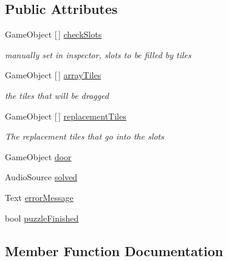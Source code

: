 \subsection*{Public Attributes}
\begin{DoxyCompactItemize}
\item 
Game\+Object \mbox{[}$\,$\mbox{]} \hyperlink{class_data_type_completion_check_ace0376e59ce94a6d019a51a160acdfad}{check\+Slots}
\begin{DoxyCompactList}\small\item\em manually set in inspector, slots to be filled by tiles \end{DoxyCompactList}\item 
Game\+Object \mbox{[}$\,$\mbox{]} \hyperlink{class_data_type_completion_check_a0ff49d8fba4310d33f2ba4d73c7a4c5c}{array\+Tiles}
\begin{DoxyCompactList}\small\item\em the tiles that will be dragged \end{DoxyCompactList}\item 
Game\+Object \mbox{[}$\,$\mbox{]} \hyperlink{class_data_type_completion_check_a449d1553d09ac32e51a559a98060a938}{replacement\+Tiles}
\begin{DoxyCompactList}\small\item\em The replacement tiles that go into the slots \end{DoxyCompactList}\item 
Game\+Object \hyperlink{class_data_type_completion_check_a30fb1fb9074db5c7585e72a1ea4f85d7}{door}
\item 
Audio\+Source \hyperlink{class_data_type_completion_check_ab5a51018023ce893836ccfabf1c73f60}{solved}
\item 
Text \hyperlink{class_data_type_completion_check_ae9a30b339b4e198795dfe7bc2bf57c11}{error\+Message}
\item 
bool \hyperlink{class_data_type_completion_check_a888ca57a6f64ac6e4eefa302a8067986}{puzzle\+Finished}
\end{DoxyCompactItemize}


\subsection{Member Function Documentation}
\mbox{\label{class_data_type_completion_check_a508b3241c277e5fa65a9d9510f971946}} 

